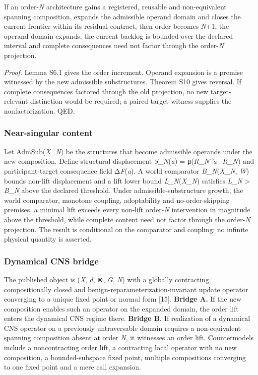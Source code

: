 If an order-\emph{N} architecture gains a registered, reusable and
non-equivalent spanning composition, expands the admissible operand
domain and closes the current frontier within its residual contract,
then order becomes \emph{N}+1, the operand domain expands, the current
backlog is bounded over the declared interval and complete consequences
need not factor through the order-\emph{N} projection.

\emph{Proof.} Lemma S6.1 gives the order increment. Operand expansion is
a premise witnessed by the new admissible substructures. Theorem S10
gives reversal. If complete consequences factored through the old
projection, no new target-relevant distinction would be required; a
paired target witness supplies the nonfactorization. QED.

\hypertarget{near-singular-content}{%
\subsubsection{Near-singular content}\label{near-singular-content}}

Let AdmSub(\emph{X\_N}) be the structures that become admissible
operands under the new composition. Define structural displacement
\emph{S\_N}(\emph{a}) = μ(\emph{R\_N\^{}a} ~\emph{R\_N}) and
participant-target consequence field Δ\emph{F}(\emph{a}). A world
comparator \emph{B\_N}(\emph{X\_N}, \emph{W}) bounds non-lift
displacement and a lift lower bound \emph{L\_N}(\emph{X\_N}) satisfies
\emph{L\_N} \textgreater{} \emph{B\_N} above the declared threshold.
Under admissible-substructure growth, the world comparator, monotone
coupling, adoptability and no-order-skipping premises, a minimal lift
exceeds every non-lift order-\emph{N} intervention in magnitude above
the threshold, while complete content need not factor through the
order-\emph{N} projection. The result is conditional on the comparator
and coupling; no infinite physical quantity is asserted.

\hypertarget{dynamical-cns-bridge}{%
\subsubsection{Dynamical CNS bridge}\label{dynamical-cns-bridge}}

The published object is (\emph{X}, \emph{d}, ⊗, \emph{G}, \emph{N}) with
a globally contracting, compositionally closed and
benign-reparameterization-invariant update operator converging to a
unique fixed point or normal form {[}15{]}. \textbf{Bridge A.} If the
new composition enables such an operator on the expanded domain, the
order lift enters the dynamical CNS regime there. \textbf{Bridge B.} If
realization of a dynamical CNS operator on a previously untraversable
domain requires a non-equivalent spanning composition absent at order
\emph{N}, it witnesses an order lift. Countermodels include a
noncontracting order lift, a contracting local operator with no new
composition, a bounded-subspace fixed point, multiple compositions
converging to one fixed point and a mere call expansion.

